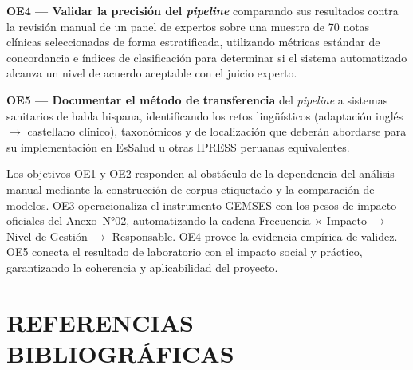 \documentclass[12pt,a4paper,oneside]{book}
\begin{document}
\textbf{OE4 --- Validar la precisión del \textit{pipeline}} comparando sus resultados contra la revisión manual de un panel de expertos sobre una muestra de 70 notas clínicas seleccionadas de forma estratificada, utilizando métricas estándar de concordancia e índices de clasificación para determinar si el sistema automatizado alcanza un nivel de acuerdo aceptable con el juicio experto.

\textbf{OE5 --- Documentar el método de transferencia} del \textit{pipeline} a sistemas sanitarios de habla hispana, identificando los retos lingüísticos (adaptación inglés $\rightarrow$ castellano clínico), taxonómicos y de localización que deberán abordarse para su implementación en EsSalud u otras IPRESS peruanas equivalentes.

\vspace{10pt}
Los objetivos OE1 y OE2 responden al obstáculo de la dependencia del análisis manual mediante la construcción de corpus etiquetado y la comparación de modelos. OE3 operacionaliza el instrumento GEMSES con los pesos de impacto oficiales del Anexo~N°02, automatizando la cadena Frecuencia $\times$ Impacto $\rightarrow$ Nivel de Gestión $\rightarrow$ Responsable. OE4 provee la evidencia empírica de validez. OE5 conecta el resultado de laboratorio con el impacto social y práctico, garantizando la coherencia y aplicabilidad del proyecto.

\chapter*{REFERENCIAS BIBLIOGRÁFICAS}
\end{document}
